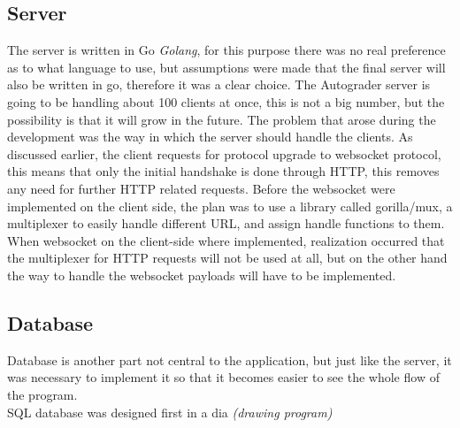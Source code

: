 \subsection{Server}
The server is written in Go \emph{Golang}, for this purpose there was no real  preference as to what language to use, but assumptions were made that the final server will also be written in go, therefore it was a clear choice. The Autograder server is going to be handling about 100 clients at once,  this is not a big number, but the possibility is that it will grow in the future. The problem that arose during the development was the way in which the server should handle the clients. As discussed earlier, the client requests for protocol upgrade to websocket protocol, this means that only the initial handshake is done through HTTP, this removes any need for further HTTP related requests. Before the websocket were implemented on the client side, the plan was to use a library called gorilla/mux, a multiplexer to easily handle different URL, and assign handle functions to them. When websocket on the client-side where implemented, realization occurred that the multiplexer for HTTP requests will not be used at all, but on the other hand the way to handle the websocket payloads will have to be implemented. 
\subsection{Database}
Database is another part not central to the application, but just like the server, it was necessary to implement it so that it becomes easier to see the whole flow of the program.
\\SQL database was designed first in a dia \emph{(drawing program)} 

